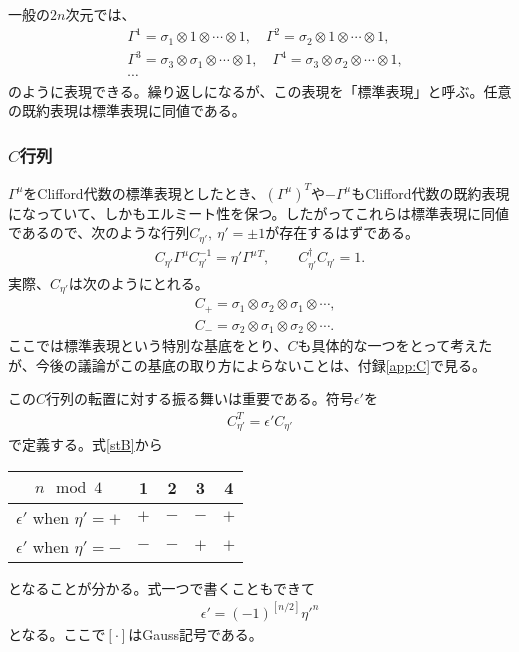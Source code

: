 \documentclass[12pt,a4paper]{jlreq}
\begin{document}
一般の$2n$次元では、
\begin{align}
  &\Gamma^{1}=\sigma_1\otimes 1 \otimes \cdots \otimes 1,\quad
  \Gamma^{2}=\sigma_2\otimes 1 \otimes \cdots \otimes 1,\nonumber\\
  &\Gamma^{3}=\sigma_3\otimes\sigma_1\otimes \cdots \otimes 1,\quad
  \Gamma^{4}=\sigma_3\otimes\sigma_2 \otimes \cdots \otimes 1,\nonumber\\
  &\cdots
  \label{stdrep}
\end{align}
のように表現できる。繰り返しになるが、この表現を「標準表現」と呼ぶ。任意の既約表現は標準表現に同値である。

\subsubsection{$C$行列}
$\Gamma^{\mu}$をClifford代数の標準表現としたとき、$(\Gamma^{\mu})^{T}$や$-\Gamma^{\mu}$もClifford代数の既約表現になっていて、しかもエルミート性を保つ。したがってこれらは標準表現に同値であるので、次のような行列$C_{\eta'},\ \eta'=\pm 1$が存在するはずである。
\begin{align}
  C_{\eta'}\Gamma^{\mu}C_{\eta'}^{-1}=\eta' \Gamma^{\mu}{}^{T},\qquad C_{\eta'}^{\dag}C_{\eta'}=1.
  \label{C}
\end{align}
実際、$C_{\eta'}$は次のようにとれる。
\begin{align}
  &C_{+}=\sigma_1\otimes \sigma_2\otimes \sigma_1\otimes \cdots,\\
  &C_{-}=\sigma_2\otimes \sigma_1\otimes \sigma_2\otimes \cdots.
  \label{stB}
\end{align}
ここでは標準表現という特別な基底をとり、$C$も具体的な一つをとって考えたが、今後の議論がこの基底の取り方によらないことは、付録\ref{app:C}で見る。

この$C$行列の転置に対する振る舞いは重要である。符号$\epsilon'$を
\begin{align}
  C_{\eta'}^{T}=\epsilon' C_{\eta'}
\end{align}
で定義する。式\eqref{stB}から
\begin{center}
  \begin{tabular}{|c|c|c|c|c|}\hline
    $n \mod 4$           & 1 & 2 & 3 & 4\\ \hline\hline
    $\epsilon'$ when $\eta'=+$ & $+$ & $-$ & $-$ & $+$\\ \hline
    $\epsilon'$ when $\eta'=-$ & $-$ & $-$ & $+$ & $+$\\ \hline
  \end{tabular}
\end{center}
となることが分かる。式一つで書くこともできて
\begin{align*}
  \epsilon'=(-1)^{[n/2]}\eta'^n
\end{align*}
となる。ここで$[\cdot]$はGauss記号である。
\end{document}
